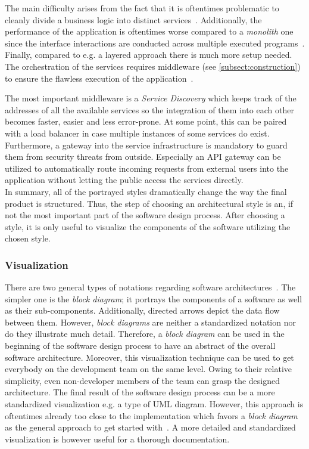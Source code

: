\documentclass[12pt,a4paper,twoside]{report}
\begin{document}
The main difficulty arises from the fact that it is oftentimes problematic to cleanly
divide a business logic into distinct services~\cite{fowler-monolith-first}.
Additionally, the performance of the application is oftentimes worse compared to
a \textit{monolith} one since the interface interactions are conducted across multiple
executed programs~\cite{richards-sa-patterns}.
Finally, compared to e.g. a layered approach there is much more setup needed.
The orchestration of the services requires middleware (see \ref{subsect:construction})
to ensure the flawless execution of the application~\cn.

The most important middleware is a \textit{Service Discovery} which keeps track
of the addresses of all the available services so the integration of them into
each other becomes faster, easier and less error-prone.
At some point, this can be paired with a load balancer in case
multiple instances of some services do exist.
Furthermore, a gateway into the service infrastructure is mandatory to guard
them from security threats from outside. Especially an API gateway can be
utilized to automatically route incoming requests from external users into the
application without letting the public access the services directly.\\

In summary, all of the portrayed styles dramatically change the way the final product
is structured. Thus, the step of choosing an architectural style is an, if not the
most important part of the software design process. After choosing a style,
it is only useful to visualize the components of the software utilizing the chosen style.


\subsubsection{Visualization}

There are two general types of notations regarding software architectures~\cite{sommerville-se}.
The simpler one is the \textit{block diagram}; it portrays the components of
a software as well as their sub-components. Additionally, directed arrows depict
the data flow between them. However, \textit{block diagrams} are neither a
standardized notation nor do they illustrate much detail.
Therefore, a \textit{block diagram} can be used in the beginning of the software
design process to have an abstract of the overall software architecture.
Moreover, this visualization technique can be used to get everybody on the development team
on the same level. Owing to their relative simplicity, even non-developer members
of the team can grasp the designed architecture. The final result of
the software design process can be a more standardized visualization
e.g. a type of UML diagram. However, this approach is oftentimes already too close
to the implementation which favors a \textit{block diagram} as the general
approach to get started with~\cite{sommerville-se}. A more detailed and standardized
visualization is however useful for a thorough documentation.
\end{document}
